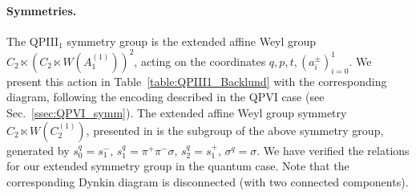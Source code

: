 \documentclass[12pt,a4paper]{article}
\numberwithin{equation}{section}
\begin{document}
\paragraph{Symmetries.}
The QPIII$_1$ symmetry group is the extended affine Weyl group $C_2\ltimes \left(C_2\ltimes W\left(A_1^{(1)}\right)\right)^2$, acting on the coordinates $q,p,t,(a_i^{\pm})_{i=0}^1$.
We present this action in Table~\ref{table:QPIII1_Backlund} with the corresponding diagram, following the encoding described in the QPVI case (see Sec.~\ref{ssec:QPVI_symm}). The extended affine Weyl group symmetry $C_2\ltimes W\left(C_2^{(1)}\right)$, presented in \cite[Definition 2.16]{NY12} is the subgroup of the above symmetry group, generated by $s_0^q=s_1^-,\, s_1^q=\pi^+\pi^-\sigma,\, s_2^q=s_1^+,\, \sigma^q=\sigma$. We have verified the relations for our extended symmetry group in the quantum case. Note that the corresponding Dynkin diagram is disconnected (with two connected components).
\end{document}
